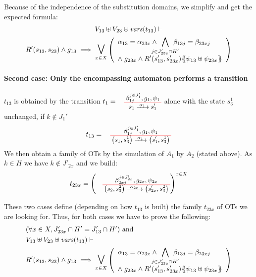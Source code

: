 \documentclass[runningheads]{llncs}
\begin{document}
\begin{enumerate}
Because of the independence of the substitution domains, we simplify and get the expected formula:
	\begin{multline*}
  V_{13} \uplus V_{23} \uplus \fvars{t_{13}} \vdash\\ R^{\prime}\mpar{s_{13}, s_{23}} \wedge g_{13} \implies \operatorname*{\bigsymb{\bigvee}}_{x \in X} \mpar{\everymath{\displaystyle}\begin{array}{l}
			\alpha_{13} = \alpha_{23x} \wedge \bigwedge_\subbox{j \in J'_{23x} \cap H'} \beta_{13j} = \beta_{23xj} \\[12pt]
			\nwedge g_{23x} \wedge R^{\prime}\mpar{s'_{13}, s'_{23x}}\psubst{\psi_{13} \uplus \psi_{23x}}
		\end{array}} 
	\end{multline*}
	
\smallskip

\paragraph{Second case: Only the encompassing automaton performs a transition}
 $t_{13}$ is obtained  by  the transition $t_1=\OTx{1}{}{1}{1}$ alone with the state $s^1_3$ unchanged, if $k \not\in J_1'$
\[t_{13} = \OT{\mpar{s_1, s^1_3}}{\mpar{s'_1, s^1_3}}{\alpha_1}{\beta_{1j}^{j \in J'_1}}{g_1}{\psi_1}
\]
We then obtain a family of OTs by the simulation of $A_1$ by $A_2$ (stated above).
As  $k \in H$ we have $k \not\in J'_{2x}$ and we build:
\[t_{23x} = \left(
\OT{\mpar{s_2, s^2_3}}{\mpar{s'_{2x}, s^2_3}}{\alpha_{2x}}{\beta_{2xj}^{j \in J'_{2x}}}{g_{2x}}{\psi_{2x}} \right)^{x\in X}\]


These two cases define (depending on how $t_{13}$ is built) the family $t_{23x}$ of OTs we are looking for.
Thus, for both cases we have to prove the following:
\begin{align*}		
		&\mpar{\forall x \in X, J'_{23x} \cap H' =
 J'_{13} \cap H'} \text{ and }\\
		&  V_{13} \uplus V_{23} \uplus \fvars{t_{13}} \vdash\\ & R'\mpar{s_{13}, s_{23}} \wedge g_{13} \implies \operatorname*{\bigsymb{\bigvee}}_{x \in X} \mpar{\everymath{\displaystyle}\begin{array}{l}
			\alpha_{13} = \alpha_{23x} \wedge \bigwedge_\subbox{j \in J'_{23x} \cap H'} \beta_{13j} = \beta_{23xj} \\[12pt]
			\nwedge g_{23x} \wedge R'\mpar{s'_{13}, s'_{23x}}\psubst{\psi_{13} \uplus \psi_{23x}}
		\end{array}} 
	\end{align*}
	

\end{enumerate}
\end{document}
